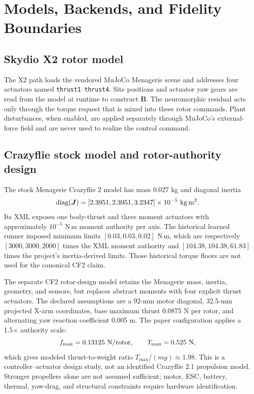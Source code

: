 \documentclass[10pt,twocolumn]{article}
\begin{document}
\section{Models, Backends, and Fidelity Boundaries}

\subsection{Skydio X2 rotor model}

The X2 path loads the vendored MuJoCo Menagerie scene and addresses four
actuators named \texttt{thrust1}--\texttt{thrust4}. Site positions and actuator
yaw gears are read from the model at runtime to construct $\bm B$. The
neuromorphic residual acts only through the torque request that is mixed into
these rotor commands. Plant disturbances, when enabled, are applied separately
through MuJoCo's external-force field and are never used to realize the control
command.

\subsection{Crazyflie stock model and rotor-authority design}

The stock Menagerie Crazyflie 2 model has mass 0.027 kg and diagonal inertia
\begin{equation}
    \operatorname{diag}(\bm J)=
    [2.3951,2.3951,3.2347]\times10^{-5}\ {\rm kg\,m^2}.
\end{equation}
Its XML exposes one body-thrust and three moment actuators with approximately
$10^{-5}$ N\,m moment authority per axis. The historical learned runner imposed
minimum limits $[0.03,0.03,0.02]$ N\,m, which are respectively
$[3000,3000,2000]$ times the XML moment authority and
$[104.38,104.38,61.83]$ times the project's inertia-derived limits. Those
historical torque floors are not used for the canonical CF2 claim.

The separate CF2 rotor-design model retains the Menagerie mass, inertia,
geometry, and sensors, but replaces abstract moments with four explicit thrust
actuators. The declared assumptions are a 92-mm motor diagonal, 32.5-mm
projected X-arm coordinates, base maximum thrust 0.0875 N per rotor, and
alternating yaw reaction coefficient 0.005 m. The paper configuration applies
a 1.5$\times$ authority scale:
\begin{equation}
    f_{\max}=0.13125\ {\rm N/rotor},\qquad
    T_{\max}=0.525\ {\rm N},
\end{equation}
which gives modeled thrust-to-weight ratio $T_{\max}/(mg)\approx1.98$. This is
a controller--actuator design study, not an identified Crazyflie 2.1
propulsion model. Stronger propellers alone are not assumed sufficient; motor,
ESC, battery, thermal, yaw-drag, and structural constraints require hardware
identification.
\end{document}
